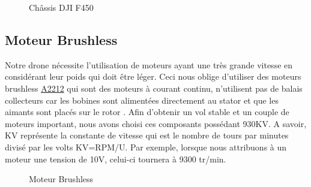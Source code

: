 	\begin{figure} [H]
		\begin{center}
			\centering
		\end{center}
		\caption{Châssis DJI F450}
	\end{figure}

	\subsection{Moteur Brushless}
	Notre drone nécessite l'utilisation de moteurs ayant une très grande vitesse en considérant leur poids qui doit être léger. Ceci nous oblige d'utiliser des moteurs brushless \underline{A2212} qui sont des moteurs à courant continu, n'utilisent pas de balais collecteurs car les bobines sont alimentées directement au stator et que les aimants sont placés sur le rotor \cite{Cube}. Afin d'obtenir un vol stable et un couple de moteurs important, nous avons choisi ces composants possédant 930KV. A savoir, KV représente la constante de vitesse qui est le nombre de tours par minutes divisé par les volts KV=RPM/U. Par exemple, lorsque nous attribuons à un moteur une tension de 10V, celui-ci tournera à 9300 tr/min. 
	\begin{figure} [H]
		\begin{center}
			\centering
		\end{center}
		\caption{Moteur Brushless}
	\end{figure}
